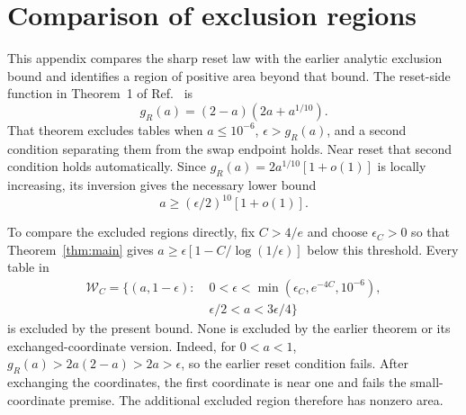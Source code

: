 \documentclass[aps,pra,reprint,amsmath,amssymb,nofootinbib,floatfix,longbibliography]{revtex4-2}
\theoremstyle{aps}
\newcommand{\eps}{\epsilon}
\begin{document}
\section{Comparison of exclusion regions}\label{app:exclusions}\label{sec:exclusions}

This appendix compares the sharp reset law with the earlier analytic exclusion bound and identifies a region of positive area beyond that bound. The reset-side function in Theorem~1 of Ref.~\cite{Shahbeigi2024} is
\begin{equation}\label{eq:oldg}
 g_R(a)=(2-a)(2a+a^{1/10}).
\end{equation}
That theorem excludes tables when $a\le10^{-6}$, $\eps>g_R(a)$, and a second condition separating them from the swap endpoint holds. Near reset that second condition holds automatically. Since
$g_R(a)=2a^{1/10}[1+o(1)]$ is locally increasing, its inversion gives the necessary lower bound
\begin{equation}\label{eq:oldinverse}
 a\ge(\eps/2)^{10}[1+o(1)].
\end{equation}

To compare the excluded regions directly, fix $C>4/e$ and choose $\eps_C>0$ so that Theorem~\ref{thm:main} gives $a\ge\eps[1-C/\log(1/\eps)]$ below this threshold. Every table in
\begin{equation}\label{eq:newwedge}
 \begin{split}
 \mathcal W_C=\bigl\{(a,1-\eps):\;&0<\eps<
 \min(\eps_C,e^{-4C},10^{-6}),\\
 &\eps/2<a<3\eps/4\bigr\}
 \end{split}
\end{equation}
is excluded by the present bound. None is excluded by the earlier theorem or its exchanged-coordinate version. Indeed, for $0<a<1$,
$g_R(a)>2a(2-a)>2a>\eps$, so the earlier reset condition fails. After exchanging the coordinates, the first coordinate is near one and fails the small-coordinate premise. The additional excluded region therefore has nonzero area.

\clearpage

\end{document}

